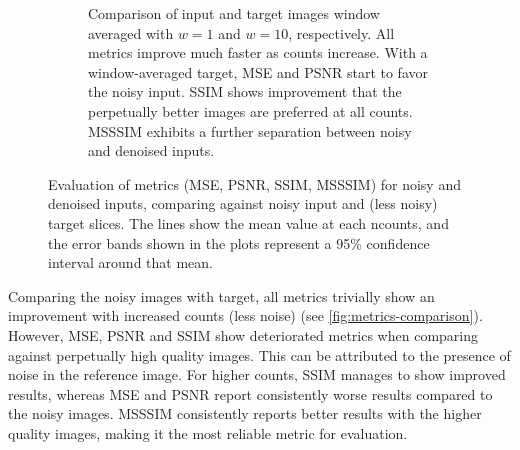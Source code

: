 \begin{figure}
\begin{subfigure}[t]{0.48\textwidth}
        \caption{Comparison of input and target images window averaged with $w=1$ and $w=10$, respectively. All metrics improve much faster as counts increase. With a window-averaged target, \gls{MSE} and \gls{PSNR} start to favor the noisy input. \gls{SSIM} shows improvement that the perpetually better images are preferred at all counts. \gls{MSSSIM} exhibits a further separation between noisy and denoised inputs.}
        \label{fig:metrics-comparison-averaged-target}
    \end{subfigure}
    \caption{Evaluation of metrics (\gls{MSE}, \gls{PSNR}, \gls{SSIM}, \gls{MSSSIM}) for noisy and denoised inputs, comparing against noisy input and (less noisy) target slices. The lines show the mean value at each \gls{ncounts}, and the error bands shown in the plots represent a 95\% confidence interval around that mean.}
    \label{fig:combined-metrics-comparison}
\end{figure}


Comparing the noisy images with target, all metrics trivially show an improvement with increased counts (less noise) (see \cref{fig:metrics-comparison}). However, \gls{MSE}, \gls{PSNR} and \gls{SSIM} show deteriorated metrics when comparing against perpetually high quality images. This can be attributed to the presence of noise in the reference image. For higher counts, \gls{SSIM} manages to show improved results, whereas \gls{MSE} and \gls{PSNR} report consistently worse results compared to the noisy images. \gls{MSSSIM} consistently reports better results with the higher quality images, making it the most reliable metric for evaluation.


